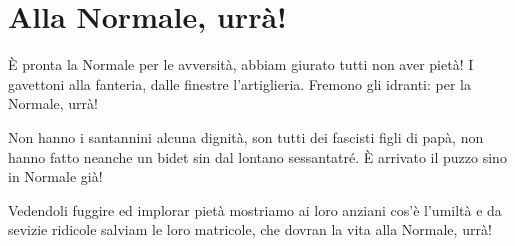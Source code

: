 \section{Alla Normale, urrà!}
\begin{canzone}
È pronta la Normale per le avversità,
abbiam giurato tutti non aver pietà!
I gavettoni alla fanteria,
dalle finestre l'artiglieria.
Fremono gli idranti:
per la Normale, urrà!

Non hanno i santannini alcuna dignità,
son tutti dei fascisti figli di papà,
non hanno fatto neanche un bidet
sin dal lontano sessantatré.
È arrivato il puzzo
sino in Normale già!

Vedendoli fuggire ed implorar pietà
mostriamo ai loro anziani cos'è l'umiltà
e da sevizie ridicole
salviam le loro matricole,
che dovran la vita
alla Normale, urrà!
\end{canzone}
